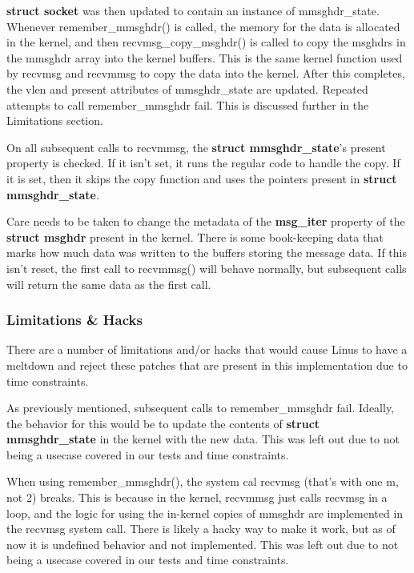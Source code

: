 \documentclass[11pt]{article}
\begin{document}
\textbf{struct socket} was then updated to contain an instance of mmsghdr\_state. Whenever remember\_mmsghdr() is called, the memory for 
the data is allocated in the kernel, and then recvmsg\_copy\_msghdr() is called to copy the msghdrs in the mmsghdr array into the kernel 
buffers. This is the same kernel function used by recvmsg and recvmmsg to copy the data into the kernel. After this completes, the vlen 
and present attributes of mmsghdr\_state are updated. Repeated attempts to call remember\_mmsghdr fail. This is discussed further in 
the Limitations section. 

On all subsequent calls to recvmmsg, the \textbf{struct mmsghdr\_state}'s present property is checked. If it isn't set, it runs the 
regular code to handle the copy. If it is set, then it skips the copy function and uses the pointers present in \textbf{struct mmsghdr\_state}.

Care needs to be taken to change the metadata of the \textbf{msg\_iter} property of the \textbf{struct msghdr} present in the kernel. There is 
some book-keeping data that marks how much data was written to the buffers storing the message data. If this isn't reset, the first call to 
recvmmsg() will behave normally, but subsequent calls will return the same data as the first call.

\subsubsection{Limitations \& Hacks}

There are a number of limitations and/or hacks that would cause Linus to have a meltdown and reject these patches that are present in this implementation
due to time constraints. 

As previously mentioned, subsequent calls to remember\_mmsghdr fail. Ideally, the behavior for this would be to update the contents of 
\textbf{struct mmsghdr\_state} in the kernel with the new data. This was left out due to not being a usecase covered in our tests and time constraints.

When using remember\_mmsghdr(), the system cal recvmsg (that's with one m, not 2) breaks. This is because in the kernel, recvmmsg just calls 
recvmsg in a loop, and the logic for using the in-kernel copies of mmsghdr are implemented in the recvmsg system call. There is likely a hacky 
way to make it work, but as of now it is undefined behavior and not implemented. This was left out due to not being a usecase covered in our tests and time constraints.
\end{document}
